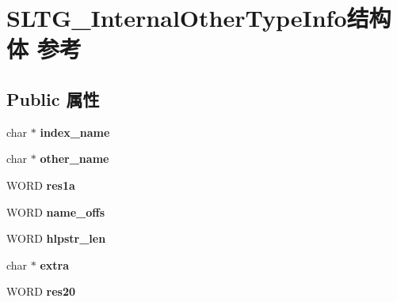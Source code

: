 \hypertarget{struct_s_l_t_g___internal_other_type_info}{}\section{S\+L\+T\+G\+\_\+\+Internal\+Other\+Type\+Info结构体 参考}
\label{struct_s_l_t_g___internal_other_type_info}
\subsection*{Public 属性}
\begin{DoxyCompactItemize}
\item 
\mbox{\label{struct_s_l_t_g___internal_other_type_info_a6df56e3685bfd71c155c9667801ffe1d}} 
char $\ast$ {\bfseries index\+\_\+name}
\item 
\mbox{\label{struct_s_l_t_g___internal_other_type_info_a09b9214690d2987230db03a90467236e}} 
char $\ast$ {\bfseries other\+\_\+name}
\item 
\mbox{\label{struct_s_l_t_g___internal_other_type_info_a38b8eeee698a7c0078a23c0378412e7a}} 
W\+O\+RD {\bfseries res1a}
\item 
\mbox{\label{struct_s_l_t_g___internal_other_type_info_a8837b23d3bc9db21172b1805501282df}} 
W\+O\+RD {\bfseries name\+\_\+offs}
\item 
\mbox{\label{struct_s_l_t_g___internal_other_type_info_a415cca27c1babefc82ee4121c28aebe7}} 
W\+O\+RD {\bfseries hlpstr\+\_\+len}
\item 
\mbox{\label{struct_s_l_t_g___internal_other_type_info_ad180de97bfd068c191ec177707186080}} 
char $\ast$ {\bfseries extra}
\item 
\mbox{\label{struct_s_l_t_g___internal_other_type_info_a31debaa57c9f501ac8cc54d6afce248d}} 
W\+O\+RD {\bfseries res20}
\item 
\mbox{\label{struct_s_l_t_g___internal_other_type_info_a86982dca73f06fc599743a75e2d29cc7}} 

\end{DoxyCompactItemize}
